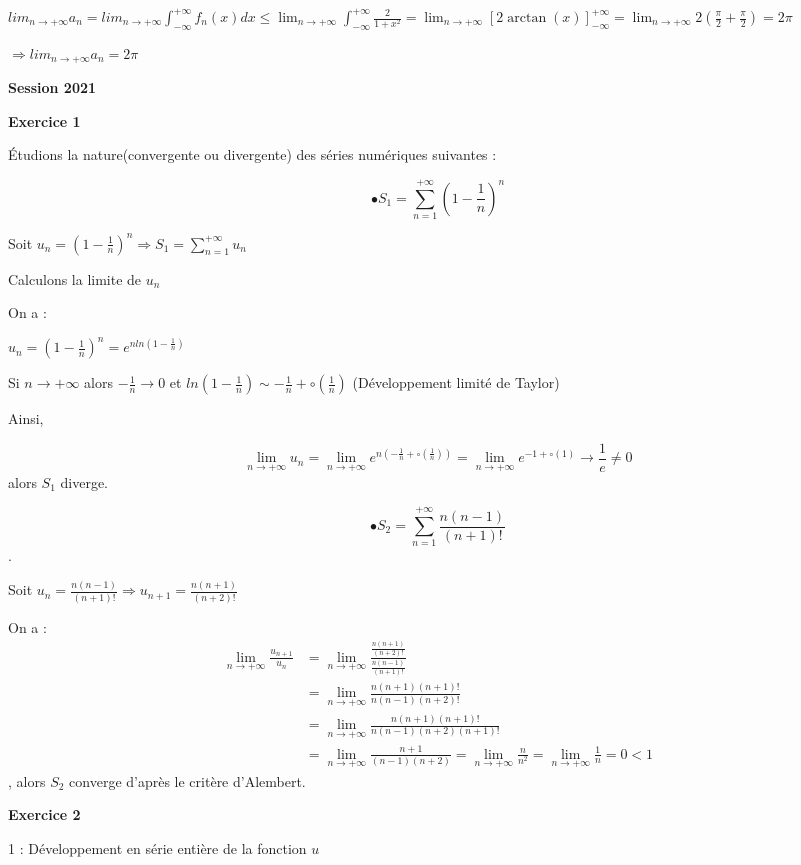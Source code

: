 \documentclass[12pt]{article}
\begin{document}
\begin{spacing}{1.5}
$lim_{n\to +\infty}a_n=lim_{n\to +\infty}\int_{-\infty}^{+\infty}f_n(x)dx\leq \lim_{n\to +\infty}\int_{-\infty}^{+\infty}\frac{2}{1+x^2}=\lim_{n\to +\infty}[2\arctan(x)]_{-\infty}^{+\infty}=\lim_{n\to +\infty}2(\frac{\pi}{2}+\frac{\pi}{2})=2\pi$

$\Longrightarrow lim_{n\to +\infty}a_n=2\pi$

\medskip
\textbf{Session 2021}

\textbf{Exercice 1}

Étudions la nature(convergente ou divergente) des séries numériques suivantes : 

\[\bullet S_1=\sum^{+\infty}_{n=1}(1-\frac{1}{n})^n\]

Soit $u_n=(1-\frac{1}{n})^n\Longrightarrow S_1=\sum^{+\infty}_{n=1}u_n$

Calculons la limite de $u_n$

On a :

$u_n=(1-\frac{1}{n})^n=e^{nln(1-\frac{1}{n})}$

Si $n\longrightarrow +\infty$ alors $-\frac{1}{n}\longrightarrow 0$ et $ln(1-\frac{1}{n})\sim -\frac{1}{n}+\circ(\frac{1}{n})$ (Développement limité de Taylor)


Ainsi,

 \[\lim_{n\to +\infty} u_n=\lim_{n\to +\infty}e^{n(-\frac{1}{n}+\circ(\frac{1}{n}))}=\lim_{n\to +\infty}e^{-1+\circ(1)}\longrightarrow \frac{1}{e}\neq 0\] alors $S_1$ diverge.

\medskip
\[\bullet S_2=\sum^{+\infty}_{n=1}\frac{n(n-1)}{(n+1)!}\].

Soit $u_n=\frac{n(n-1)}{(n+1)!}\Rightarrow u_{n+1}=\frac{n(n+1)}{(n+2)!}$

On a : 
\begin{align*}
\lim_{n\to +\infty}\frac{u_{n+1}}{u_n} &=\lim_{n\to +\infty}\frac{\frac{n(n+1)}{(n+2)!}}{\frac{n(n-1)}{(n+1)!}}\\
&=\lim_{n\to +\infty}\frac{n(n+1)(n+1)!}{n(n-1)(n+2)!}\\
&=\lim_{n\to +\infty}\frac{n(n+1)(n+1)!}{n(n-1)(n+2)(n+1)!}\\
&=\lim_{n\to +\infty}\frac{n+1}{(n-1)(n+2)}=\lim_{n\to +\infty}\frac{n}{n^2}=\lim_{n\to +\infty}\frac{1}{n}=0<1
\end{align*}, alors $S_2$ converge d'après le critère d'Alembert.



\medskip
\textbf{Exercice 2 }



1 : Développement en série entière de la fonction \( u \)


\end{spacing}
\end{document}
